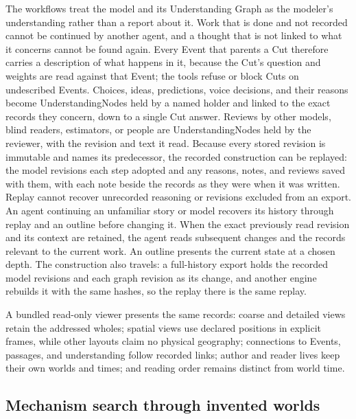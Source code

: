 \documentclass[11pt,a4paper]{article}
\begin{document}
The workflows treat the model and its Understanding Graph as the modeler's
understanding rather than a report about it. Work that is done and not recorded
cannot be continued by another agent, and a thought that is not linked to what it
concerns cannot be found again. Every Event that parents a Cut therefore carries a
description of what happens in it, because the Cut's question and weights are read
against that Event; the tools refuse or block Cuts on undescribed Events. Choices,
ideas, predictions, voice decisions, and their reasons become UnderstandingNodes held
by a named holder and linked to the exact records they concern, down to a single Cut
answer. Reviews by other models, blind readers, estimators, or people are
UnderstandingNodes held by the reviewer, with the revision and text it read. Because
every stored revision is immutable and names its predecessor, the recorded
construction can be replayed: the model revisions each step adopted and any
reasons, notes, and reviews saved with them, with each note beside the records
as they were when it was written. Replay cannot recover unrecorded reasoning
or revisions excluded from an export. An agent continuing an unfamiliar story or
model recovers its history through replay and an outline before changing it.
When the exact previously read revision and its context are retained, the agent
reads subsequent changes and the records relevant to the current work. An outline
presents the current state at a chosen depth. The
construction also travels: a full-history export holds the recorded model
revisions and each graph revision as its change, and another engine rebuilds it with the same hashes,
so the replay there is the same replay.

A bundled read-only viewer presents the same records: coarse and detailed views
retain the addressed wholes; spatial views use declared positions in explicit
frames, while other layouts claim no physical geography; connections to Events,
passages, and understanding follow recorded links; author and reader lives keep
their own worlds and times; and reading order remains distinct from world time.

\subsection{Mechanism search through invented worlds}
\label{sec:mechanism-search}
\end{document}

